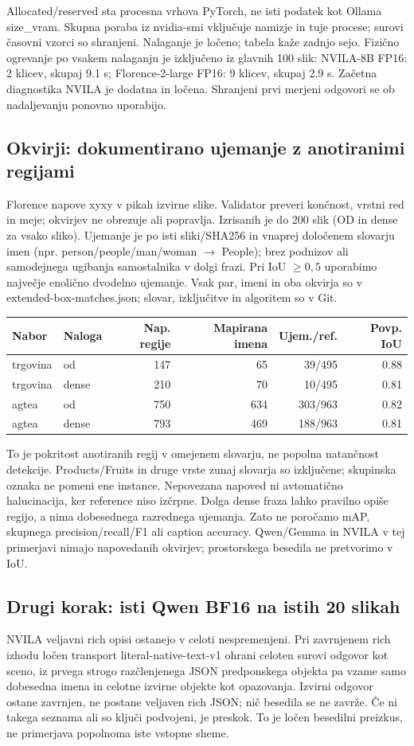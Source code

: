 Allocated/reserved sta procesna vrhova PyTorch, ne isti podatek kot Ollama size\_vram. Skupna poraba iz nvidia-smi vključuje namizje in tuje procese; surovi časovni vzorci so shranjeni. Nalaganje je ločeno; tabela kaže zadnjo sejo. Fizično ogrevanje po vsakem nalaganju je izključeno iz glavnih 100 slik: NVILA-8B FP16: 2 klicev, skupaj 9.1 s; Florence-2-large FP16: 9 klicev, skupaj 2.9 s. Začetna diagnostika NVILA je dodatna in ločena. Shranjeni prvi merjeni odgovori se ob nadaljevanju ponovno uporabijo.
\subsection*{Okvirji: dokumentirano ujemanje z anotiranimi regijami}
Florence napove xyxy v pikah izvirne slike. Validator preveri končnost, vrstni red in meje; okvirjev ne obrezuje ali popravlja. Izrisanih je do 200 slik (OD in dense za vsako sliko). Ujemanje je po isti sliki/SHA256 in vnaprej določenem slovarju imen (npr. person/people/man/woman $\rightarrow$ People); brez podnizov ali samodejnega ugibanja samostalnika v dolgi frazi. Pri IoU $\geq 0,5$ uporabimo največje enolično dvodelno ujemanje. Vsak par, imeni in oba okvirja so v extended-box-matches.json; slovar, izključitve in algoritem so v Git.
\begin{center}\small\begin{tabular}{p{2.1cm}p{1.5cm}rrrr}\toprule
Nabor & Naloga & Nap. regije & Mapirana imena & Ujem./ref. & Povp. IoU \\ \midrule
trgovina & od & 147 & 65 & 39/495 & 0.88 \\
trgovina & dense & 210 & 70 & 10/495 & 0.81 \\
agtea & od & 750 & 634 & 303/963 & 0.82 \\
agtea & dense & 793 & 469 & 188/963 & 0.81 \\
\bottomrule\end{tabular}\end{center}

To je pokritost anotiranih regij v omejenem slovarju, ne popolna natančnost detekcije. Products/Fruits in druge vrste zunaj slovarja so izključene; skupinska oznaka ne pomeni ene instance. Nepovezana napoved ni avtomatično halucinacija, ker reference niso izčrpne. Dolga dense fraza lahko pravilno opiše regijo, a nima dobesednega razrednega ujemanja. Zato ne poročamo mAP, skupnega precision/recall/F1 ali caption accuracy. Qwen/Gemma in NVILA v tej primerjavi nimajo napovedanih okvirjev; prostorskega besedila ne pretvorimo v IoU.
\subsection*{Drugi korak: isti Qwen BF16 na istih 20 slikah}
NVILA veljavni rich opisi ostanejo v celoti nespremenjeni. Pri zavrnjenem rich izhodu ločen transport literal-native-text-v1 ohrani celoten surovi odgovor kot sceno, iz prvega strogo razčlenjenega JSON predponskega objekta pa vzame samo dobesedna imena in celotne izvirne objekte kot opazovanja. Izvirni odgovor ostane zavrnjen, ne postane veljaven rich JSON; nič besedila se ne zavrže. Če ni takega seznama ali so ključi podvojeni, je preskok. To je ločen besedilni preizkus, ne primerjava popolnoma iste vstopne sheme.

